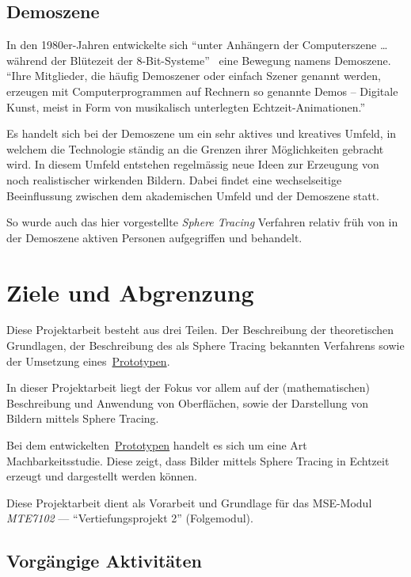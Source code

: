 \subsection{Demoszene}
\label{subsec:demoscene}

In den 1980er-Jahren entwickelte sich ``unter Anhängern der
Computerszene \dots{} während der Blütezeit der
8-Bit-Systeme''~\parencite{wikipedia_foundation_demoszene_2015} eine Bewegung
namens Demoszene. ``Ihre Mitglieder, die häufig Demoszener oder einfach
Szener genannt werden, erzeugen mit Computerprogrammen auf Rechnern so
genannte Demos – Digitale Kunst, meist in Form von musikalisch
unterlegten
Echtzeit-Animationen.''~\parencite{wikipedia_foundation_demoszene_2015}

Es handelt sich bei der Demoszene um ein sehr aktives und kreatives
Umfeld, in welchem die Technologie ständig an die Grenzen ihrer
Möglichkeiten gebracht wird. In diesem Umfeld entstehen regelmässig neue
Ideen zur Erzeugung von noch realistischer wirkenden Bildern. Dabei
findet eine wechselseitige Beeinflussung zwischen dem akademischen
Umfeld und der Demoszene statt.

So wurde auch das hier vorgestellte \textit{Sphere Tracing} Verfahren
relativ früh von in der Demoszene aktiven Personen aufgegriffen und
behandelt.

\section{Ziele und Abgrenzung}
\label{sec:objectives}

Diese Projektarbeit besteht aus drei Teilen. Der Beschreibung der
theoretischen Grundlagen, der Beschreibung des als Sphere Tracing
bekannten Verfahrens sowie der Umsetzung eines~\hyperref[chap:prototype]{Prototypen}.

In dieser Projektarbeit liegt der Fokus vor allem auf der
(mathematischen) Beschreibung und Anwendung von Oberflächen,
sowie der Darstellung von Bildern mittels Sphere Tracing.

Bei dem entwickelten~\hyperref[chap:prototype]{Prototypen} handelt es
sich um eine Art Machbarkeitsstudie. Diese zeigt, dass Bilder mittels
Sphere Tracing in Echtzeit erzeugt und dargestellt werden können.

Diese Projektarbeit dient als Vorarbeit und Grundlage für das MSE-Modul
\textit{MTE7102} --- ``Vertiefungsprojekt 2'' (Folgemodul).

\subsection{Vorgängige Aktivitäten}
\label{subsec:preliminaries}

